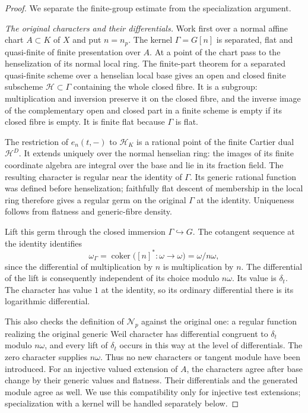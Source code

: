 \begin{proof}
We separate the finite-group estimate from the specialization argument.

\emph{The original characters and their differentials.}
Work first over a normal affine chart $A\subset K$ of $X$ and put
$n=n_p$. The kernel $\Gamma=G[n]$ is separated, flat and quasi-finite
of finite presentation over $A$. At a point of the chart pass to
the henselization of its normal local ring. The finite-part theorem
for a separated quasi-finite scheme over a henselian local base
gives an open and closed finite subscheme $\mathcal H\subset\Gamma$
containing the whole closed fibre\cite{hodge-finite-part}. It is a
subgroup: multiplication and inversion preserve it on the closed
fibre, and the inverse image of the complementary open and closed
part in a finite scheme is empty if its closed fibre is empty.
It is finite flat because $\Gamma$ is flat.

The restriction of $e_n(t,-)$ to $\mathcal H_K$ is a rational point
of the finite Cartier dual $\mathcal H^D$. It extends uniquely over
the normal henselian ring: the images of its finite coordinate
algebra are integral over the base and lie in its fraction field.
The resulting character is regular near the identity of $\Gamma$.
Its generic rational function was defined before henselization;
faithfully flat descent of membership in the local ring therefore
gives a regular germ on the original $\Gamma$ at the identity.
Uniqueness follows from flatness and generic-fibre density.

Lift this germ through the closed immersion $\Gamma\hookrightarrow G$.
The cotangent sequence at the identity identifies
\[
 \omega_\Gamma=\operatorname{coker}
       \bigl([n]^*:\omega\longrightarrow\omega\bigr)
       =\omega/n\omega,
 \tag{HS3}
\]
since the differential of multiplication by $n$ is multiplication
by $n$. The differential of the lift is consequently independent
of its choice modulo $n\omega$. Its value is $\delta_t$.
The character has value $1$ at the identity, so its ordinary
differential there is its logarithmic differential.

This also checks the definition of $\mathcal N_p$ against the
original one: a regular function realizing the original generic
Weil character has differential congruent to $\delta_t$ modulo
$n\omega$, and every lift of $\delta_t$ occurs in this way at the
level of differentials. The zero character supplies $n\omega$.
Thus no new characters or tangent module have been introduced.
For an injective valued extension of $A$, the characters agree
after base change by their generic values and flatness. Their
differentials and the generated module agree as well. We use this
compatibility only for injective test extensions; specialization
with a kernel will be handled separately below.


\end{proof}
